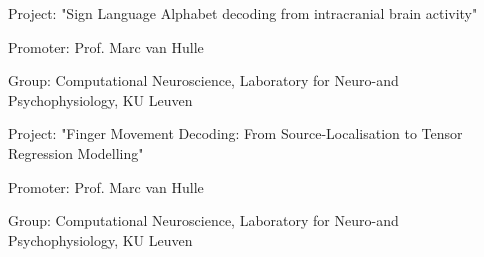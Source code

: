 
\begin{cventries}
{\begin{cvitems}\item Project: "Sign Language Alphabet decoding from intracranial brain activity"
\item Promoter: Prof. Marc van Hulle
\item Group:  Computational Neuroscience, Laboratory for Neuro-and Psychophysiology, KU Leuven
\end{cvitems}
}

{\begin{cvitems}\item Project: "Finger Movement Decoding: From Source-Localisation to Tensor Regression Modelling"
\item Promoter: Prof. Marc van Hulle
\item Group:  Computational Neuroscience, Laboratory for Neuro-and Psychophysiology, KU Leuven
\end{cvitems}
}


\end{cventries}
